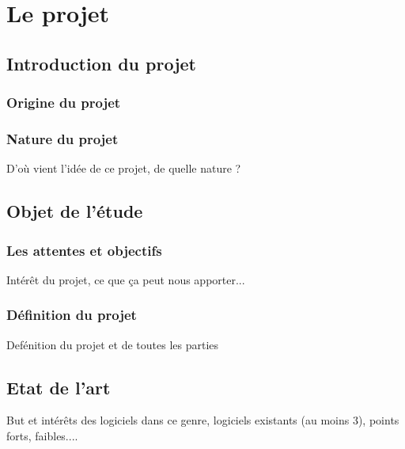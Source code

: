 \section{Le projet}

\subsection{Introduction du projet}
\subsubsection{Origine du projet}
\subsubsection{Nature du projet}

D'où vient l'idée de ce projet, de quelle nature ?

\subsection{Objet de l'étude}

\subsubsection{Les attentes et objectifs}
Intérêt du projet, ce que ça peut nous apporter...

\subsubsection{Définition du projet}
Defénition du projet et de toutes les parties

\subsection{Etat de l'art}
But et intérêts des logiciels dans ce genre, logiciels existants (au moins 3), points forts, faibles....